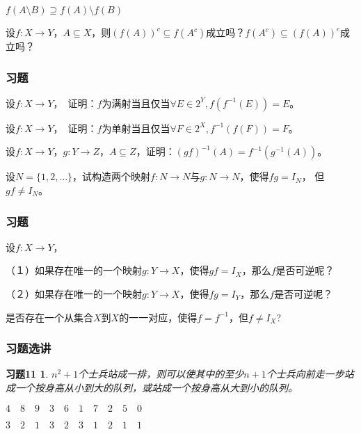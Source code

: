 \documentclass{beamer}
\begin{document}
\begin{CJK*}{UTF8}{gbsn}
\begin{frame}
\begin{Exercise}
    $f(A \setminus B) \supseteq f(A) \setminus f(B)$
    
  \end{Exercise}
  \begin{Exercise}
    设$f:X\to Y$，$A \subseteq X$，则$(f(A))^c \subseteq f(A^c)$成立吗？$ f(A^c)\subseteq (f(A))^c$成立吗？
  \end{Exercise}

\end{frame}

\begin{frame}
  \frametitle{习题}
  \begin{Exercise}
    设$f:X\to Y$，　证明：$f$为满射当且仅当$\forall E \in 2^Y, f(f^{-1}(E)) = E$。
  \end{Exercise}

  \begin{Exercise}
    设$f:X\to Y$，　证明：$f$为单射当且仅当$\forall F \in 2^X, f^{-1}(f(F)) = F$。    
  \end{Exercise}
    \begin{Exercise}
    设$f:X \to Y$，$g:Y \to Z$，$A \subseteq Z$，证明：$(gf)^{-1}(A) = f^{-1}(g^{-1}(A))$。
  \end{Exercise}
  \begin{Exercise}
    设$N=\{1,2,\ldots\}$，试构造两个映射$f:N \to N$与$g:N\to N$，使得$fg = I_N$，
    但$gf \neq I_N$。
  \end{Exercise}
\end{frame}
\begin{frame}
  \frametitle{习题}
 \begin{Exercise}
    设$f:X \to Y$，

    （１）如果存在唯一的一个映射$g:Y\to X$，使得$gf = I_X$，那么$f$是否可逆呢？

    （２）如果存在唯一的一个映射$g:Y\to X$，使得$fg = I_Y$，那么$f$是否可逆呢？

  \end{Exercise}
  \begin{Exercise}
    是否存在一个从集合$X$到$X$的一一对应，使得$f=f^{-1}$，但$f \neq I_X$?
  \end{Exercise}
\end{frame}
\newtheorem*{Exercise11}{习题11}

\begin{frame}
  \frametitle{习题选讲}
  \begin{Exercise11}
    $n^2+1$个士兵站成一排，则可以使其中的至少$n+1$个士兵向前走一步站成一个按身高从小到大的队列，或站成一个按身高从大到小的队列。
  \end{Exercise11}
  $4\quad8\quad9\quad3\quad6\quad1\quad7\quad2\quad5\quad0$

  $3\quad2\quad1\quad3\quad2\quad3\quad1\quad2\quad1\quad1$
  
\end{frame}
\end{CJK*}
\end{document}
